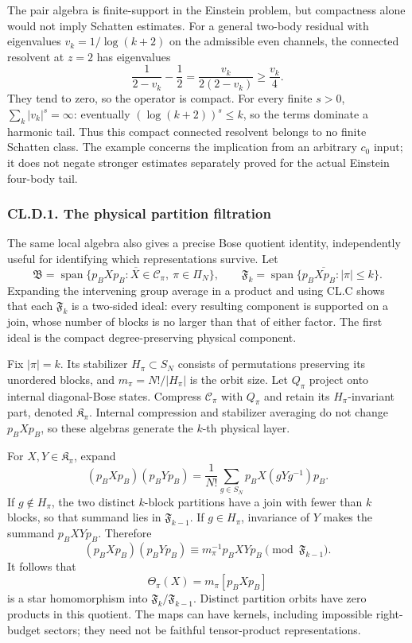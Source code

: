 \documentclass[a4paper,11pt]{article}
\numberwithin{equation}{section}
\begin{document}
The pair algebra is finite-support in the Einstein problem, but compactness alone would not imply Schatten estimates. For a general two-body residual with eigenvalues \(v_k=1/\log(k+2)\) on the admissible even channels, the connected resolvent at \(z=2\) has eigenvalues \[
\frac1{2-v_k}-\frac12=\frac{v_k}{2(2-v_k)}\geq\frac{v_k}{4}.
\] They tend to zero, so the operator is compact. For every finite \(s>0\), \(\sum_k|v_k|^s=\infty\): eventually \((\log(k+2))^s\leq k\), so the terms dominate a harmonic tail. Thus this compact connected resolvent belongs to no finite Schatten class. The example concerns the implication from an arbitrary \(c_0\) input; it does not negate stronger estimates separately proved for the actual Einstein four-body tail.

\hypertarget{cl.d.1.-the-physical-partition-filtration}{%
\subsubsection{CL.D.1. The physical partition filtration}\label{cl.d.1.-the-physical-partition-filtration}}

The same local algebra also gives a precise Bose quotient identity, independently useful for identifying which representations survive. Let \[
\mathfrak B=\overline{\operatorname{span}\{p_BXp_B:X\in\mathcal C_\pi,\ \pi\in\Pi_N\}},
\qquad
\mathfrak F_k=\overline{\operatorname{span}\{p_BXp_B:|\pi|\leq k\}}.
\] Expanding the intervening group average in a product and using CL.C shows that each \(\mathfrak F_k\) is a two-sided ideal: every resulting component is supported on a join, whose number of blocks is no larger than that of either factor. The first ideal is the compact degree-preserving physical component.

Fix \(|\pi|=k\). Its stabilizer \(H_\pi\subset S_N\) consists of permutations preserving its unordered blocks, and \(m_\pi=N!/|H_\pi|\) is the orbit size. Let \(Q_\pi\) project onto internal diagonal-Bose states. Compress \(\mathcal C_\pi\) with \(Q_\pi\) and retain its \(H_\pi\)-invariant part, denoted \(\mathfrak K_\pi\). Internal compression and stabilizer averaging do not change \(p_BXp_B\), so these algebras generate the \(k\)-th physical layer.

For \(X,Y\in\mathfrak K_\pi\), expand \[
(p_BXp_B)(p_BYp_B)
=\frac1{N!}\sum_{g\in S_N}p_BX(gYg^{-1})p_B.
\] If \(g\notin H_\pi\), the two distinct \(k\)-block partitions have a join with fewer than \(k\) blocks, so that summand lies in \(\mathfrak F_{k-1}\). If \(g\in H_\pi\), invariance of \(Y\) makes the summand \(p_BXYp_B\). Therefore \[
(p_BXp_B)(p_BYp_B)
\equiv m_\pi^{-1}p_BXYp_B\pmod{\mathfrak F_{k-1}}.
\tag{CL.D5}
\] It follows that \[
\Theta_\pi(X)=m_\pi[p_BXp_B]
\] is a star homomorphism into \(\mathfrak F_k/\mathfrak F_{k-1}\). Distinct partition orbits have zero products in this quotient. The maps can have kernels, including impossible right-budget sectors; they need not be faithful tensor-product representations.
\end{document}
